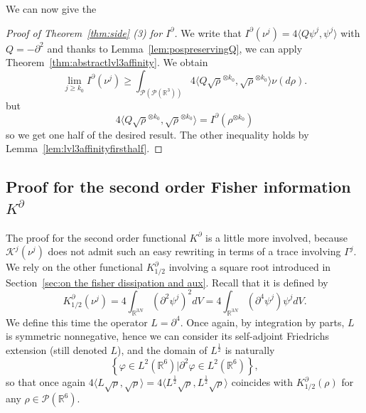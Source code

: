 \documentclass[11pt,a4paper]{article}
\theoremstyle{definition}
\theoremstyle{plain}
\begin{document}
We can now give the
\begin{proof}[Proof of Theorem~\ref{thm:side} (3) for $I^\partial$]
We write that $I^\partial(\nu^j)=4\langle Q\psi^j,\psi^j \rangle$ with $Q=-\partial^2$ and thanks to Lemma~\ref{lem:pospreservingQ}, we can apply Theorem~\ref{thm:abstractlvl3affinity}. We obtain
$$\lim_{j\geq k_0} I^\partial(\nu^j) \geq \int_{\mathcal{P}(\mathcal{P}(\mathbb{R}^{3}))} 4\langle Q \sqrt\rho^{\otimes k_0},\sqrt\rho^{\otimes k_0}\rangle \nu(d\rho).$$
but
$$4\langle Q \sqrt\rho^{\otimes k_0},\sqrt\rho^{\otimes k_0}\rangle=I^\partial(\rho^{\otimes k_0})$$
so we get one half of the desired result. The other inequality holds by Lemma~\ref{lem:lvl3affinityfirsthalf}.
\end{proof}

\subsection{Proof for the second order Fisher information $K^\partial$}

    The proof for the second order functional $K^\partial$ is a little more involved, because $\mathcal{K}^j(\nu^j)$ does not admit such an easy rewriting in terms of a trace involving $\Gamma^j$. We rely on the other functional $K^\partial_{1/2}$ involving a square root introduced in Section~\ref{sec:on the fisher dissipation and aux}. Recall that it is defined by
    $$ K_{1/2}^{\partial}(\nu^j)=4\int_{\mathbb{R}^{3N}}\left( \partial^2\psi^j \right)^2 dV=4\int_{\mathbb{R}^{3N}}( \partial^4\psi^j) \psi^j dV.$$
    We define this time the operator $L=\partial^4$.
    Once again, by integration by parts, $L$ is symmetric nonnegative, hence we can consider its self-adjoint Friedrichs extension (still denoted $L$), and the domain of $L^\frac{1}{2}$ is naturally
    $$\left\{ \varphi \in L^2(\mathbb{R}^6) \vert  \partial^2 \varphi \in L^2(\mathbb{R}^6)\right\},$$
    so that once again $4\langle L \sqrt{\rho},\sqrt{\rho}\rangle=4\langle L^\frac{1}{2}\sqrt{\rho},L^\frac{1}{2}\sqrt{\rho}\rangle$ coincides with $K^\partial_{1/2}(\rho)$ for any $\rho \in \mathcal{P}(\mathbb{R}^6)$.
\end{document}
